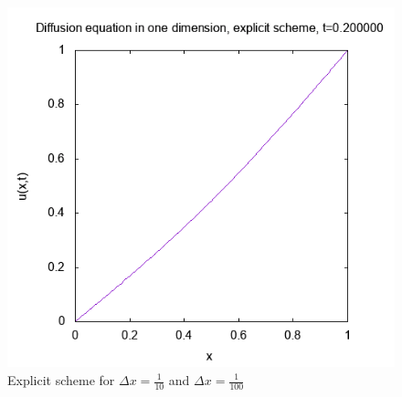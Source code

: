 \documentclass[a4paper, twoside, 11pt]{report}
\theoremstyle{theorem}
\theoremstyle{remark}
\theoremstyle{exemple}
\begin{document}
\begin{figure}[h!]
{\begin{minipage}[c]{.30\linewidth}
                        \includegraphics[scale = 0.55]{images/ex-0,01-t2.png}
                    \end{minipage}
                }
                \caption{Explicit scheme for $\Delta x = \frac{1}{10}$ and $\Delta x = \frac{1}{100}$}
            \end{figure}
\end{document}
